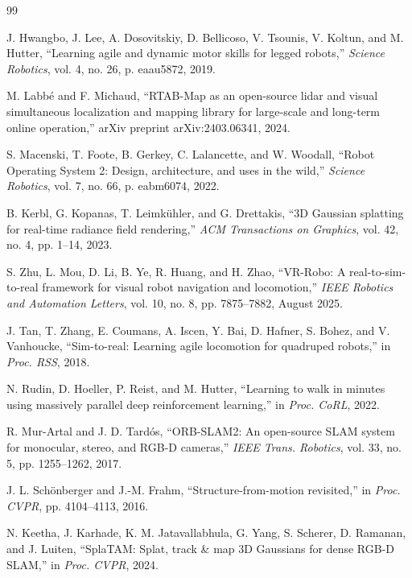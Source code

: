 \documentclass[10pt,twocolumn]{ICCAS}
\begin{document}
\begin{thebibliography}{99}

J. Hwangbo, J. Lee, A. Dosovitskiy, D. Bellicoso, V. Tsounis, V. Koltun, and M. Hutter, ``Learning agile and dynamic motor skills for legged robots,'' \textit{Science Robotics}, vol. 4, no. 26, p. eaau5872, 2019.

M. Labb{\'e} and F. Michaud, ``RTAB-Map as an open-source lidar and visual simultaneous localization and mapping library for large-scale and long-term online operation,'' arXiv preprint arXiv:2403.06341, 2024.

S. Macenski, T. Foote, B. Gerkey, C. Lalancette, and W. Woodall, ``Robot Operating System 2: Design, architecture, and uses in the wild,'' \textit{Science Robotics}, vol. 7, no. 66, p. eabm6074, 2022.

B. Kerbl, G. Kopanas, T. Leimk{\"u}hler, and G. Drettakis, ``3D Gaussian splatting for real-time radiance field rendering,'' \textit{ACM Transactions on Graphics}, vol. 42, no. 4, pp. 1--14, 2023.

S. Zhu, L. Mou, D. Li, B. Ye, R. Huang, and H. Zhao, ``VR-Robo: A real-to-sim-to-real framework for visual robot navigation and locomotion,'' \textit{IEEE Robotics and Automation Letters}, vol. 10, no. 8, pp. 7875--7882, August 2025.

J. Tan, T. Zhang, E. Coumans, A. Iscen, Y. Bai, D. Hafner, S. Bohez, and V. Vanhoucke, ``Sim-to-real: Learning agile locomotion for quadruped robots,'' in \textit{Proc. RSS}, 2018.

N. Rudin, D. Hoeller, P. Reist, and M. Hutter, ``Learning to walk in minutes using massively parallel deep reinforcement learning,'' in \textit{Proc. CoRL}, 2022.

R. Mur-Artal and J. D. Tard{\'o}s, ``ORB-SLAM2: An open-source SLAM system for monocular, stereo, and RGB-D cameras,'' \textit{IEEE Trans. Robotics}, vol. 33, no. 5, pp. 1255--1262, 2017.

J. L. Sch{\"o}nberger and J.-M. Frahm, ``Structure-from-motion revisited,'' in \textit{Proc. CVPR}, pp. 4104--4113, 2016.

N. Keetha, J. Karhade, K. M. Jatavallabhula, G. Yang, S. Scherer, D. Ramanan, and J. Luiten, ``SplaTAM: Splat, track \& map 3D Gaussians for dense RGB-D SLAM,'' in \textit{Proc. CVPR}, 2024.

\end{thebibliography}
\end{document}
